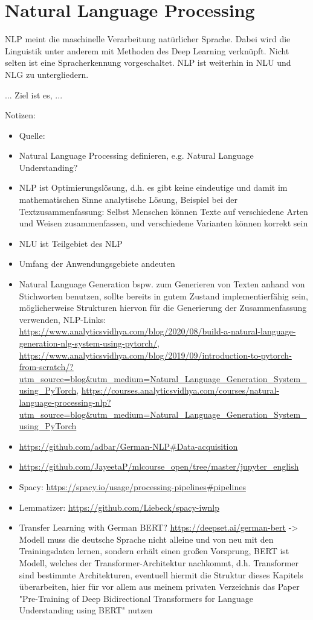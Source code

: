 \chapter{Natural Language Processing}
\thispagestyle{fancy}
\label{chap:Natural Language Processing}

\noindent
\ac{NLP} meint die maschinelle Verarbeitung natürlicher Sprache. Dabei wird die Linguistik unter anderem mit Methoden des Deep Learning verknüpft. Nicht selten ist eine Spracherkennung vorgeschaltet. \ac{NLP} ist weiterhin in \ac{NLU} und \ac{NLG} zu untergliedern.

...
Ziel ist es, ...

Notizen:
\begin{itemize}
	\item Quelle: \cite{NIT19}
	\item Natural Language Processing definieren, e.g. Natural Language Understanding?
	\item NLP ist Optimierungslösung, d.h. es gibt keine eindeutige und damit im mathematischen Sinne analytische Lösung, Beispiel bei der Textzusammenfassung: Selbst Menschen können Texte auf verschiedene Arten und Weisen zusammenfassen, und verschiedene Varianten können korrekt sein
	\item NLU ist Teilgebiet des NLP	
	\item Umfang der Anwendungsgebiete andeuten
	\item Natural Language Generation bspw. zum Generieren von Texten anhand von Stichworten benutzen, sollte bereits in gutem Zustand implementierfähig sein, möglicherweise Strukturen hiervon für die Generierung der Zusammenfassung verwenden, NLP-Links: \url{https://www.analyticsvidhya.com/blog/2020/08/build-a-natural-language-generation-nlg-system-using-pytorch/}, \url{https://www.analyticsvidhya.com/blog/2019/09/introduction-to-pytorch-from-scratch/?utm_source=blog&utm_medium=Natural_Language_Generation_System_using_PyTorch}, \url{https://courses.analyticsvidhya.com/courses/natural-language-processing-nlp?utm_source=blog&utm_medium=Natural_Language_Generation_System_using_PyTorch}
	\item \url{https://github.com/adbar/German-NLP#Data-acquisition}
	\item \url{https://github.com/JayeetaP/mlcourse_open/tree/master/jupyter_english}
	\item Spacy: \url{https://spacy.io/usage/processing-pipelines#pipelines}
	\item Lemmatizer: \url{https://github.com/Liebeck/spacy-iwnlp}
	\item Transfer Learning with German BERT? \url{https://deepset.ai/german-bert} -> Modell muss die deutsche Sprache nicht alleine und von neu  mit den Trainingsdaten lernen, sondern erhält einen großen Vorsprung, BERT ist Modell, welches der Transformer-Architektur nachkommt, d.h. Transformer sind bestimmte Architekturen, eventuell hiermit die Struktur dieses Kapitels überarbeiten, hier für vor allem aus meinem privaten Verzeichnis das Paper "Pre-Training of Deep Bidirectional Transformers for Language Understanding using BERT" nutzen

\end{itemize}
